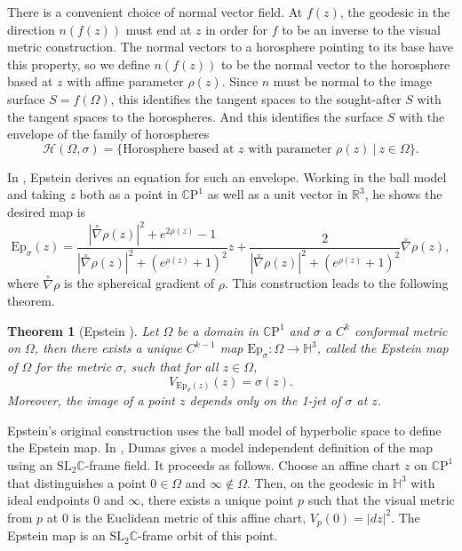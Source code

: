 \documentclass{amsart}
\newcommand{\R}{\mathbb{R}}
\newcommand{\C}{\mathbb{C}}
\newcommand{\CP}{\mathbb{C}\mathrm{P}}
\renewcommand{\H}{\mathbb{H}}
\newtheorem{thm}{Theorem}[section]
\begin{document}
There is a convenient choice of normal vector field. 
At $f(z)$, the geodesic in the direction $n(f(z))$ must end at $z$ in order for $f$ to be an inverse to the visual metric construction. 
The normal vectors to a horosphere pointing to its base have this property, so we define $n(f(z))$ to be the normal vector to the horosphere based at $z$ with affine parameter $\rho(z)$. 
Since $n$ must be normal to the image surface $S = f(\Omega)$, this identifies the tangent spaces to the sought-after $S$ with the tangent spaces to the horospheres. 
And this identifies the surface $S$ with the envelope of the family of horospheres
\[
\mathcal{H}(\Omega,\sigma) = \{ \text{Horosphere based at $z$ with parameter $\rho(z)$} \ | \ z \in \Omega \}.
\]


In \cite{epstein1984}, Epstein derives an equation for such an envelope. 
Working in the ball model and taking $z$ both as a point in $\CP^1$ as well as a unit vector in $\R^3$, he shows the desired map is 
\[
\mathrm{Ep}_\sigma(z) = \frac{|\overset{\circ}{\nabla}\rho(z)|^2 + e^{2\rho(z)} - 1}{|\overset{\circ}{\nabla}\rho(z)|^2 + (e^{\rho(z)}+1)^2} z + \frac{2}{|\overset{\circ}{\nabla}\rho(z)|^2 + (e^{\rho(z)}+1)^2} \overset{\circ}{\nabla}\rho(z),
\]
where $\overset{\circ}{\nabla}\rho$ is the sphereical gradient of $\rho$. 
This construction leads to the following theorem. 


\begin{thm}[Epstein \cite{epstein1984}]
Let $\Omega$ be a domain in $\CP^1$  and $\sigma$ a $C^k$ conformal metric on $\Omega$, then there exists a unique $C^{k-1}$ map $\mathrm{Ep}_\sigma : \Omega \to \H^3$, called the Epstein map of $\Omega$ for the metric $\sigma$, such that for all $z \in \Omega$,
\[
V_{\mathrm{Ep}_\sigma(z)}(z) = \sigma(z).
\]
Moreover, the image of a point $z$ depends only on the 1-jet of $\sigma$ at $z$.
\label{epstein-map-def}
\end{thm}

Epstein's original construction uses the ball model of hyperbolic space to define the Epstein map. 
In \cite{dumas2017}, Dumas gives a model independent definition of the map using an $\text{SL}_2\C$-frame field. 
It proceeds as follows. 
Choose an affine chart $z$ on $\CP^1$ that distinguishes a point $0 \in \Omega$ and $\infty \notin \Omega$. 
Then, on the geodesic in $\H^3$ with ideal endpoints $0$ and $\infty$, there exists a unique point $p$ such that the visual metric from $p$ at $0$ is the Euclidean metric of this affine chart, $V_p(0) = |dz|^2$. 
The Epstein map is an $\mathrm{SL}_2\C$-frame orbit of this point.     
\end{document}
